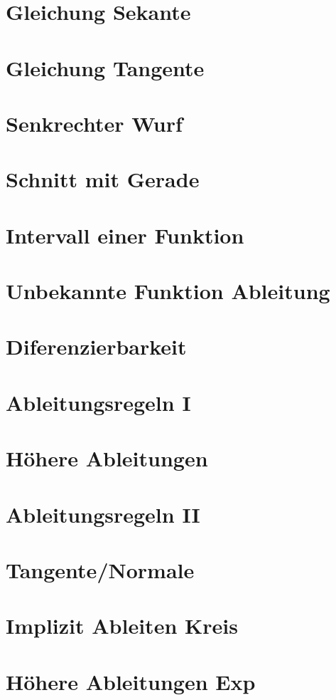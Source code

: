 \section{Gleichung Sekante}
\section{Gleichung Tangente}
\section{Senkrechter Wurf}
\section{Schnitt mit Gerade}
\section{Intervall einer Funktion}
\section{Unbekannte Funktion Ableitung}
\section{Diferenzierbarkeit}
\section{Ableitungsregeln I}
\section{Höhere Ableitungen}
\section{Ableitungsregeln II}
\section{Tangente/Normale}
\section{Implizit Ableiten Kreis}
\section{Höhere Ableitungen Exp}
